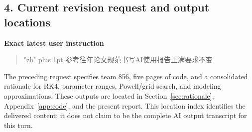 \subsection*{4. Current revision request and output locations}
\noindent\textbf{Exact latest user instruction}
\begin{quote}\zhfont\small\XeTeXlinebreaklocale "zh"\XeTeXlinebreakskip=0pt plus 1pt
参考往年论文规范书写AI使用报告上满要求不变
\end{quote}
The preceding request specifies team 856, five pages of code, and a consolidated rationale for RK4, parameter ranges, Powell/grid search, and modeling approximations. These outputs are located in Section~\ref{sec:rationale}, Appendix~\ref{app:code}, and the present report. This location index identifies the delivered content; it does not claim to be the complete AI output transcript for this turn.
